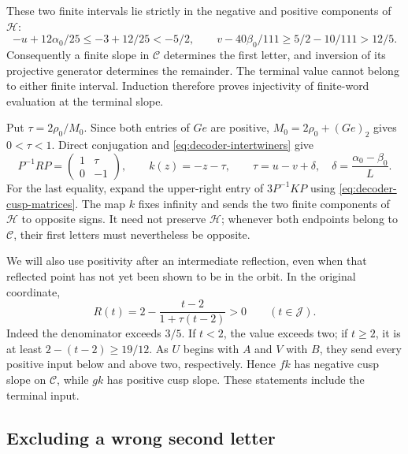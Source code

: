 These two finite intervals lie strictly in the negative and positive components of
$\mathcal H$:
$$
 -u+12\alpha_0/25\leqslant-3+12/25<-5/2,\qquad
 v-40\beta_0/111\geqslant5/2-10/111>12/5.
$$
Consequently a finite slope in $\mathcal C$ determines the first
letter, and inversion of its projective generator determines the
remainder. The terminal value cannot belong to either finite
interval. Induction therefore proves injectivity of finite-word
evaluation at the terminal slope.

Put $\tau=2\rho_0/M_0$. Since both entries of $Ge$ are positive,
$M_0=2\rho_0+(Ge)_2$ gives $0<\tau<1$. Direct conjugation and
\eqref{eq:decoder-intertwiners} give
\begin{equation}\label{eq:decoder-k}
 P^{-1}RP=\begin{pmatrix}1&\tau\\0&-1\end{pmatrix},\qquad
 k(z)=-z-\tau,\qquad
 \tau=u-v+\delta,\quad \delta=\frac{\alpha_0-\beta_0}{L}.
\end{equation}
For the last equality, expand the upper-right entry of
$3P^{-1}KP$ using \eqref{eq:decoder-cusp-matrices}.
The map $k$ fixes infinity and sends the two finite components
of $\mathcal H$ to opposite signs. It need not preserve
$\mathcal H$; whenever both endpoints belong to $\mathcal C$,
their first letters must nevertheless be opposite.

We will also use positivity after an intermediate reflection, even
when that reflected point has not yet been shown to be in the orbit.
In the original coordinate,
\begin{equation}\label{eq:decoder-positive-reflection}
 R(t)=2-\frac{t-2}{1+\tau(t-2)}>0\qquad(t\in\mathcal J).
\end{equation}
Indeed the denominator exceeds $3/5$. If $t<2$, the value exceeds
two; if $t\geqslant2$, it is at least $2-(t-2)\geqslant19/12$.
As $U$ begins with $A$ and $V$ with $B$, they send every positive
input below and above two, respectively. Hence $fk$ has negative
cusp slope on $\mathcal C$, while $gk$ has positive cusp slope.
These statements include the terminal input.

\subsection{Excluding a wrong second letter}

